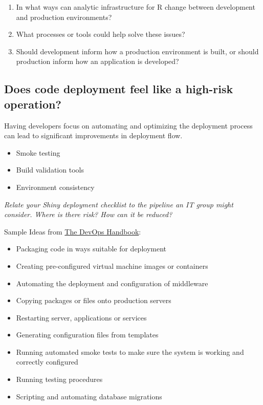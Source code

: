 \documentclass[]{book}
\providecommand{\tightlist}{%
  \setlength{\itemsep}{0pt}\setlength{\parskip}{0pt}}
\theoremstyle{definition}
\theoremstyle{definition}
\theoremstyle{definition}
\theoremstyle{remark}
\begin{document}
\begin{enumerate}
\def\labelenumi{\arabic{enumi}.}
\tightlist
\item
  In what ways can analytic infrastructure for R change between
  development and production environments?
\item
  What processes or tools could help solve these issues?
\item
  Should development inform how a production environment is built, or
  should production inform how an application is developed?
\end{enumerate}

\hypertarget{does-code-deployment-feel-like-a-high-risk-operation}{%
\subsection{Does code deployment feel like a high-risk
operation?}\label{does-code-deployment-feel-like-a-high-risk-operation}}

Having developers focus on automating and optimizing the deployment
process can lead to significant improvements in deployment flow.

\begin{itemize}
\tightlist
\item
  Smoke testing
\item
  Build validation tools
\item
  Environment consistency
\end{itemize}

\emph{Relate your Shiny deployment checklist to the pipeline an IT group
might consider. Where is there risk? How can it be reduced?}

Sample Ideas from
\href{https://www.amazon.com/dp/1942788002/ref=cm_sw_r_tw_dp_U_x_bUwpCbBTAM8HQ}{The
DevOps Handbook}:

\begin{itemize}
\tightlist
\item
  Packaging code in ways suitable for deployment
\item
  Creating pre-configured virtual machine images or containers
\item
  Automating the deployment and configuration of middleware
\item
  Copying packages or files onto production servers
\item
  Restarting server, applications or services
\item
  Generating configuration files from templates
\item
  Running automated smoke tests to make sure the system is working and
  correctly configured
\item
  Running testing procedures
\item
  Scripting and automating database migrations
\end{itemize}
\end{document}
